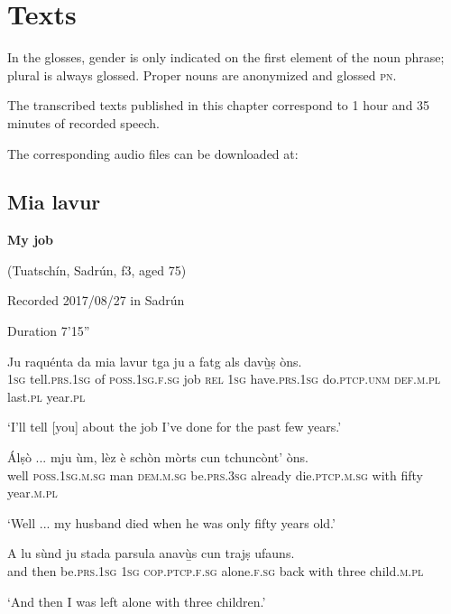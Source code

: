 \chapter{Texts}
In the glosses, gender is only indicated on the first element of the noun phrase; plural is always glossed. Proper nouns are anonymized and glossed \textsc{pn}.

The transcribed texts published in this chapter correspond to 1 hour and 35 minutes of recorded speech.

The corresponding audio files can be downloaded at:



\section{Mia lavur} 

\noindent
\textbf{My job}

\noindent
(Tuatschín, Sadrún, f3, aged 75)

\noindent
Recorded  2017/08/27 in Sadrún

\noindent
Duration 7'15''
\bigskip

\begin{linenumbers}
\gll   Ju raquénta da mia lavur tga ju a fatg als davù̱ṣ òns. \\
 \textsc{1sg} tell.\textsc{prs.1sg} of \textsc{poss.1sg.f.sg} job \textsc{rel} \textsc{1sg}  have.\textsc{prs.1sg} do.\textsc{ptcp.unm} \textsc{def.m.pl} last.\textsc{pl} year.\textsc{pl}\\
\end{linenumbers}
\medskip
\glt `I’ll tell [you] about the job I've done for the past few years.'
\medskip

\begin{linenumbers}
\gll  Álṣò ... mju ùm, lèz è schòn mòrts cun tchuncònt’ òns.  \\
well {} \textsc{poss.1sg.m.sg} man \textsc{dem.m.sg} be.\textsc{prs.3sg} already die.\textsc{ptcp.m.sg}  with fifty year.\textsc{m.pl} \\
\end{linenumbers}
\medskip
\glt `Well ... my husband died when he was only fifty years old.'
\medskip

\begin{linenumbers}
\gll A lu sùnd ju stada parsula anavù̱s cun trajṣ ufauns.   \\
and then be.\textsc{prs.1sg} \textsc{1sg} \textsc{cop.ptcp.f.sg} alone.\textsc{f.sg} back with three child.\textsc{m.pl}  \\
\end{linenumbers}
\medskip
\glt `And then I was left alone with three children.'
\medskip

